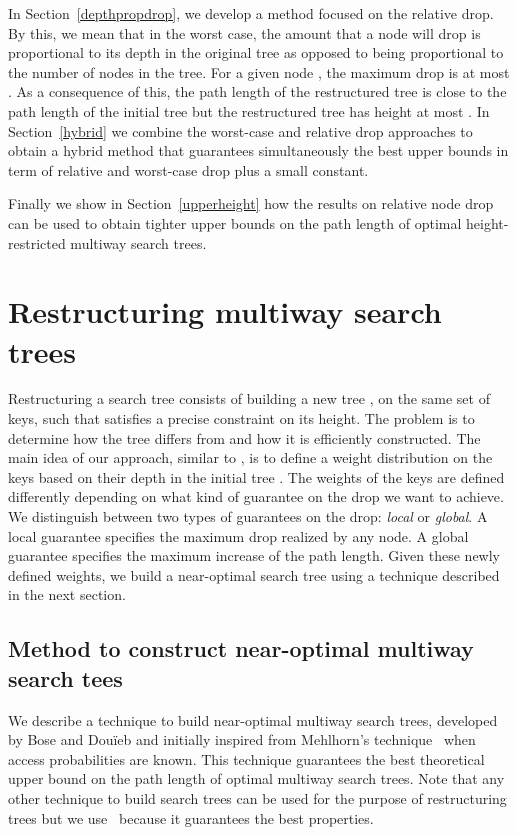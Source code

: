 \documentclass{llncs}\usepackage[english]{babel}
\begin{document}
In Section~\ref{depthpropdrop}, we develop a method focused on the relative drop. By this, we mean that in the worst case, the amount that a node will drop is proportional to its depth in the original tree as opposed to being proportional to the number of nodes in the tree. For a given node , the maximum drop is at most . As a consequence of this, the path length of the restructured tree is close to the path length of the initial tree but the restructured tree has height at most . In Section~\ref{hybrid} we combine the worst-case and relative drop approaches to obtain a hybrid method that guarantees simultaneously the best upper bounds in term of relative and worst-case drop plus a small constant. 

Finally we show in Section~\ref{upperheight} how the results on relative node drop can be used to obtain tighter upper bounds on the path length of optimal height-restricted multiway search trees.

\section{Restructuring multiway search trees}
Restructuring a search tree  consists of building a new tree , on the same set of keys, such that  satisfies a precise constraint on its height. The problem is to determine how the tree  differs from  and how it is efficiently constructed. The main idea of our approach, similar to \cite{Gagie}, is to define a weight distribution on the keys based on their depth in the initial tree . The weights of the keys are defined differently depending on what kind of guarantee on the drop we want to achieve. We distinguish between two types of guarantees on the drop: \emph{local} or \emph{global}. A local guarantee specifies the maximum drop realized by any node. A global guarantee specifies the maximum increase of the path length. Given these newly defined weights, we  build a near-optimal search tree using a technique described in the next section. 


\subsection{Method to construct near-optimal multiway search tees}
\label{nearlyopthere}
We describe a technique to build near-optimal multiway search trees, developed by Bose and Dou\"ieb \cite{nearoptbtree} and initially inspired from Mehlhorn's technique~\cite{mehlornbestbound} when access probabilities are known. This technique guarantees the best theoretical upper bound on the path length of optimal multiway search trees. Note that any other technique to build search trees can be used for the purpose of restructuring trees but we use~\cite{nearoptbtree} because it guarantees the best properties. 
\end{document}

